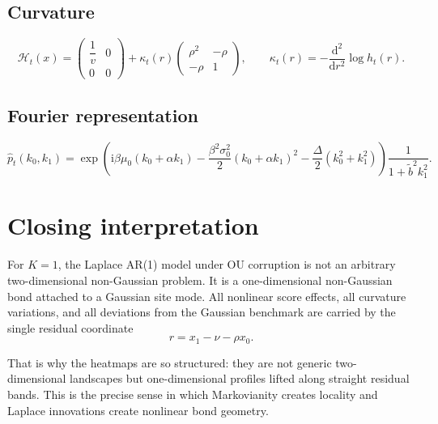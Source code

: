 \documentclass[11pt]{article}
\newcommand{\dd}{\mathrm{d}}
\newcommand{\ii}{\mathrm{i}}
\newcommand{\1}{\mathbf{1}}
\newcommand{\curv}{\mathcal{H}}
\theoremstyle{definition}
\begin{document}
\subsection*{Curvature}
\begin{equation}
\curv_t(x)=
\begin{pmatrix}
\dfrac{1}{v} & 0\\[0.5em]
0 & 0
\end{pmatrix}
+
\kappa_t(r)
\begin{pmatrix}
\rho^2 & -\rho\\[0.3em]
-\rho & 1
\end{pmatrix},
\qquad
\kappa_t(r)=-\frac{\dd^2}{\dd r^2}\log h_t(r).
\end{equation}

\subsection*{Fourier representation}
\begin{equation}
\widehat p_t(k_0,k_1)
=
\exp\!\left(
\ii\beta\mu_0(k_0+\alpha k_1)
-\frac{\beta^2\sigma_0^2}{2}(k_0+\alpha k_1)^2
-\frac{\Delta}{2}(k_0^2+k_1^2)
\right)
\frac{1}{1+\tilde b^2k_1^2}.
\end{equation}

\section{Closing interpretation}

For \(K=1\), the Laplace AR(1) model under OU corruption is not an arbitrary two-dimensional non-Gaussian problem. It is a one-dimensional non-Gaussian bond attached to a Gaussian site mode. All nonlinear score effects, all curvature variations, and all deviations from the Gaussian benchmark are carried by the single residual coordinate
\begin{equation}
r=x_1-\nu-\rho x_0.
\end{equation}

That is why the heatmaps are so structured: they are not generic two-dimensional landscapes but one-dimensional profiles lifted along straight residual bands. This is the precise sense in which Markovianity creates locality and Laplace innovations create nonlinear bond geometry.
\end{document}
